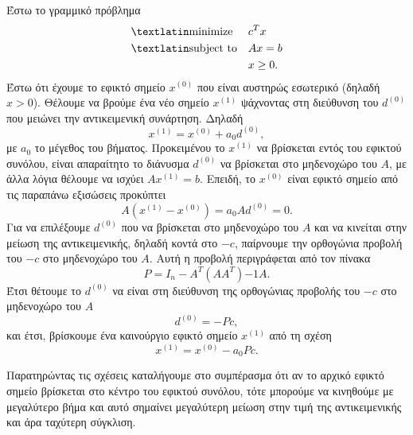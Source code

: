 Έστω το γραμμικό πρόβλημα
\begin{equation*}
    \begin{aligned}
        & {\text{\tl{minimize}}}
        & & c^T x \\
        & \text{\tl{subject to}}
        & & A x = b \\
        &&& x \ge 0.
    \end{aligned}
\end{equation*}
Έστω ότι έχουμε το εφικτό σημείο \( x^{(0)} \) που είναι αυστηρώς εσωτερικό
(δηλαδή \( x > 0\)). Θέλουμε να βρούμε ένα νέο σημείο \( x^{(1)} \) ψάχνοντας
στη διεύθυνση του \( d^{(0)} \) που μειώνει την αντικειμενική συνάρτηση. Δηλαδή
\begin{equation*}
    x^{(1)} = x^{(0)} + a_0 d^{(0)},
\end{equation*}
με \(a_0\) το μέγεθος του βήματος. Προκειμένου το \( x^{(1)} \) να βρίσκεται
εντός του εφικτού συνόλου, είναι απαραίτητο το διάνυσμα \( d^{(0)} \) να
βρίσκεται στο μηδενοχώρο του \(A\), με άλλα λόγια θέλουμε να ισχύει
\( Ax^{(1)} = b\). Επειδή, το \( x^{(0)} \) είναι εφικτό σημείο από τις παραπάνω
εξισώσεις προκύπτει
\begin{equation*}
    A\left( x^{(1)} - x^{(0)} \right) = a_0Ad^{(0)} = 0.
\end{equation*}
Για να επιλέξουμε \( d^{(0)} \) που να βρίσκεται στο μηδενοχώρο του \(A \) και
να κινείται στην μείωση της αντικειμενικής, δηλαδή κοντά στο \(-c\), παίρνουμε την
ορθογώνια προβολή του \(-c\) στο μηδενοχώρο του \(A\). Αυτή η προβολή
περιγράφεται από τον πίνακα
\begin{equation*}
    P = I_n - A^T(AA^T){-1}A.
\end{equation*}
Έτσι θέτουμε το \( d^{(0)} \) να είναι στη διεύθυνση της ορθογώνιας προβολής του
\( -c \) στο μηδενοχώρο του \(A\)
\begin{equation*}
    d^{(0)} = - Pc,
\end{equation*}
και έτσι, βρίσκουμε ένα καινούργιο εφικτό σημείο \( x^{(1)} \) από τη σχέση
\begin{equation*}
    x^{(1)} = x^{(0)} - a_0Pc.
\end{equation*}

Παρατηρώντας τις σχέσεις καταλήγουμε στο συμπέρασμα ότι αν το αρχικό εφικτό
σημείο βρίσκεται στο κέντρο του εφικτού συνόλου, τότε μπορούμε να
κινηθούμε με μεγαλύτερο βήμα και αυτό σημαίνει μεγαλύτερη μείωση στην τιμή της
αντικειμενικής και άρα ταχύτερη σύγκλιση.

